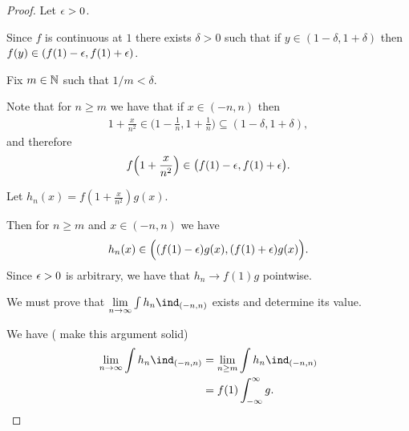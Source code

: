 \begin{proof}
    Let $\epsilon > 0$.

    Since $f$ is continuous at $1$ there exists $\delta > 0$ such that if $y \in (1 - \delta, 1 + \delta)$
    then $f(y) \in (f(1) - \epsilon, f(1) + \epsilon)$.

    Fix $m \in \mathbb{N}$ such that $1/m < \delta$.

    Note that for $n \geq m$ we have that if $x \in (-n, n)$
    then
    \begin{align*}
      1 + \frac{x}{n^2} \in \Big(1 - \frac{1}{n}, 1 + \frac{1}{n}\Big) \subseteq (1 - \delta, 1 + \delta),
    \end{align*}
    and therefore
    \begin{align*}
      f\Big(1 + \frac{x}{n^2}\Big) \in \big(f(1) - \epsilon, f(1) + \epsilon\big).
    \end{align*}

    Let $h_n(x) = f(1 +\frac{x}{n^{2}})g(x)$.

    Then for $n \geq m$ and $x \in (-n, n)$ we have
    \begin{align*}
      h_n(x) \in \Big((f(1) - \epsilon)g(x), (f(1) + \epsilon)g(x)\Big).
    \end{align*}
    Since $\epsilon > 0$ is arbitrary, we have that $h_n \to f(1)g$ pointwise.

    We must prove that $\limn \int h_n \ind_{(-n, n)}$ exists and determine its value.

    We have ( make this argument solid)
    \begin{align*}
      \limn \int h_n \ind_{(-n, n)}
      &= \lim_{n \geq m} \int h_n \ind_{(-n, n)} \\
      &= f(1)\int_{-\infty}^\infty g.
    \end{align*}
\end{proof}

